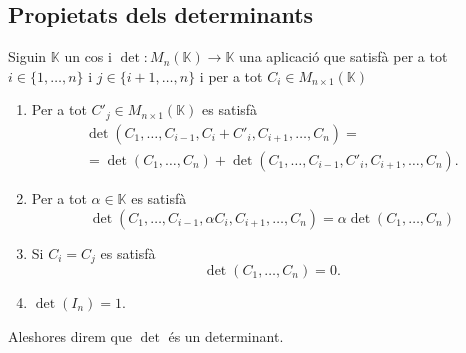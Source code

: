 \documentclass[../Apunts.tex]{subfiles}
\begin{document}
	\subsection{Propietats dels determinants}
	\begin{definition}[Determinant]
		\label{def:determinant d'una matriu}
		Siguin \(\mathbb{K}\) un cos i \(\det\colon M_{n}(\mathbb{K})\longrightarrow\mathbb{K}\) una aplicació que satisfà per a tot \(i\in\{1,\dots,n\}\) i \(j\in\{i+1,\dots,n\}\) i per a tot \(C_{i}\in M_{n\times1}(\mathbb{K})\)
		\begin{enumerate}
			\item Per a tot \(C'_{j}\in M_{n\times1}(\mathbb{K})\) es satisfà
			\begin{multline*}
			\det(C_{1},\dots,C_{i-1},C_{i}+C'_{i},C_{i+1},\dots,C_{n})=\\
			=\det(C_{1},\dots,C_{n})+\det(C_{1},\dots,C_{i-1},C'_{i},C_{i+1},\dots,C_{n}).
			\end{multline*}
			\item Per a tot \(\alpha\in\mathbb{K}\) es satisfà 
			\[\det(C_{1},\dots,C_{i-1},\alpha C_{i},C_{i+1},\dots,C_{n})=\alpha\det(C_{1},\dots,C_{n})\]
			\item Si \(C_{i}=C_{j}\) es satisfà
			\[\det(C_{1},\dots,C_{n})=0.\]
			\item \(\det(I_{n})=1\).
		\end{enumerate}
		Aleshores direm que \(\det\) és un determinant.
	\end{definition}
	\begin{proposition}
		
	\end{proposition}
%	
%	
%
\end{document}
